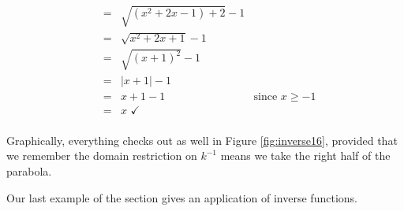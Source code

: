 {\begin{enumerate}
\[\begin{array}{rclr}
& = & \sqrt{\left(x^2+2x-1\right)+2}-1 & \\

& = & \sqrt{x^2+2x+1}-1 & \\

& = & \sqrt{(x+1)^2}-1 & \\

& = & |x+1| -1 & \\

& = & x+1 -1 & \mbox{since $x \geq -1$}\\

& = & x \, \, \checkmark &\\

\end{array}\]

Graphically, everything checks out as well in Figure \ref{fig:inverse16}, provided that we remember the domain restriction on $k^{-1}$ means we take the right half of the parabola.


\end{enumerate}
}

\medskip

Our last example of the section gives an application of inverse functions.  

\medskip

